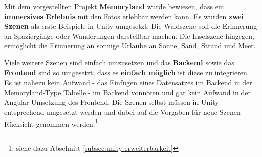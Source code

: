 


Mit dem vorgestellten Projekt \textbf{Memoryland} wurde bewiesen, dass ein \textbf{immersives Erlebnis} mit den Fotos erlebbar werden kann. Es wurden \textbf{zwei Szenen} als erste Beispiele in Unity umgesetzt. Die Waldszene soll die Erinnerung an Spaziergänge oder Wanderungen darstellbar machen. Die Inselszene hingegen, ermöglicht die Erinnerung an sonnige Urlaube an Sonne, Sand, Strand und Meer.

Viele weitere Szenen sind einfach umzusetzen und das \textbf{Backend} sowie das \textbf{Frontend} sind so umgesetzt, dass es \textbf{einfach möglich} ist diese zu integrieren. Es ist nahezu kein Aufwand - das Einfügen eines Datensatzes im Backend in der Memoryland-Type Tabelle - im Backend vonnöten und gar kein Aufwand in der Angular-Umsetzung des Frontend. Die Szenen selbst müssen in Unity entsprechend umgesetzt werden und dabei auf die Vorgaben für neue Szenen Rücksicht genommen werden.\footnote{siehe dazu Abschnitt \ref{subsec:unity-erweiterbarkeit}}




